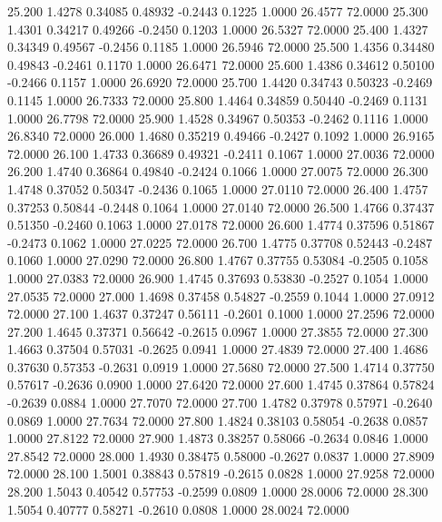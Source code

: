   25.200   1.4278   0.34085   0.48932  -0.2443   0.1225   1.0000  26.4577  72.0000
  25.300   1.4301   0.34217   0.49266  -0.2450   0.1203   1.0000  26.5327  72.0000
  25.400   1.4327   0.34349   0.49567  -0.2456   0.1185   1.0000  26.5946  72.0000
  25.500   1.4356   0.34480   0.49843  -0.2461   0.1170   1.0000  26.6471  72.0000
  25.600   1.4386   0.34612   0.50100  -0.2466   0.1157   1.0000  26.6920  72.0000
  25.700   1.4420   0.34743   0.50323  -0.2469   0.1145   1.0000  26.7333  72.0000
  25.800   1.4464   0.34859   0.50440  -0.2469   0.1131   1.0000  26.7798  72.0000
  25.900   1.4528   0.34967   0.50353  -0.2462   0.1116   1.0000  26.8340  72.0000
  26.000   1.4680   0.35219   0.49466  -0.2427   0.1092   1.0000  26.9165  72.0000
  26.100   1.4733   0.36689   0.49321  -0.2411   0.1067   1.0000  27.0036  72.0000
  26.200   1.4740   0.36864   0.49840  -0.2424   0.1066   1.0000  27.0075  72.0000
  26.300   1.4748   0.37052   0.50347  -0.2436   0.1065   1.0000  27.0110  72.0000
  26.400   1.4757   0.37253   0.50844  -0.2448   0.1064   1.0000  27.0140  72.0000
  26.500   1.4766   0.37437   0.51350  -0.2460   0.1063   1.0000  27.0178  72.0000
  26.600   1.4774   0.37596   0.51867  -0.2473   0.1062   1.0000  27.0225  72.0000
  26.700   1.4775   0.37708   0.52443  -0.2487   0.1060   1.0000  27.0290  72.0000
  26.800   1.4767   0.37755   0.53084  -0.2505   0.1058   1.0000  27.0383  72.0000
  26.900   1.4745   0.37693   0.53830  -0.2527   0.1054   1.0000  27.0535  72.0000
  27.000   1.4698   0.37458   0.54827  -0.2559   0.1044   1.0000  27.0912  72.0000
  27.100   1.4637   0.37247   0.56111  -0.2601   0.1000   1.0000  27.2596  72.0000
  27.200   1.4645   0.37371   0.56642  -0.2615   0.0967   1.0000  27.3855  72.0000
  27.300   1.4663   0.37504   0.57031  -0.2625   0.0941   1.0000  27.4839  72.0000
  27.400   1.4686   0.37630   0.57353  -0.2631   0.0919   1.0000  27.5680  72.0000
  27.500   1.4714   0.37750   0.57617  -0.2636   0.0900   1.0000  27.6420  72.0000
  27.600   1.4745   0.37864   0.57824  -0.2639   0.0884   1.0000  27.7070  72.0000
  27.700   1.4782   0.37978   0.57971  -0.2640   0.0869   1.0000  27.7634  72.0000
  27.800   1.4824   0.38103   0.58054  -0.2638   0.0857   1.0000  27.8122  72.0000
  27.900   1.4873   0.38257   0.58066  -0.2634   0.0846   1.0000  27.8542  72.0000
  28.000   1.4930   0.38475   0.58000  -0.2627   0.0837   1.0000  27.8909  72.0000
  28.100   1.5001   0.38843   0.57819  -0.2615   0.0828   1.0000  27.9258  72.0000
  28.200   1.5043   0.40542   0.57753  -0.2599   0.0809   1.0000  28.0006  72.0000
  28.300   1.5054   0.40777   0.58271  -0.2610   0.0808   1.0000  28.0024  72.0000
